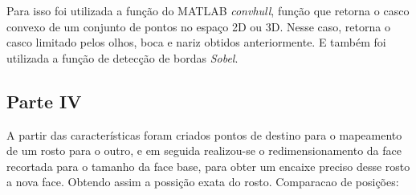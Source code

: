 \documentclass[journal]{IEEEtran}
\begin{document}
Para isso foi utilizada a função do MATLAB \textit{convhull}, função que retorna o casco convexo de um conjunto de pontos no espaço 2D ou 3D. Nesse caso, retorna o casco limitado pelos olhos, boca e nariz obtidos anteriormente. E também foi utilizada a função de detecção de bordas \textit{Sobel}.
\begin{figure}[h]
\centering
{}
\end{figure}

\subsection*{Parte IV}

A partir das características foram criados pontos de destino para o mapeamento de um rosto para o outro, e em seguida realizou-se o redimensionamento da face recortada para o tamanho da face base, para obter um encaixe preciso desse rosto a nova face. Obtendo assim a possição exata do rosto.
Comparacao de posições:
\end{document}

